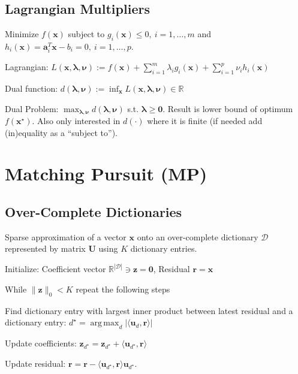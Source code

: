 \documentclass[a4paper, 11pt, landscape]{article}
\DeclareMathOperator*{\argmax}{arg\,max}
\begin{document}
\begin{multicols*}{3}
\subsection{Lagrangian Multipliers}
Minimize  $f(\mathbf{x})$ subject to $g_i(\mathbf{x}) \leq 0,\ i = 1, \ldots, m$ and $h_i(\mathbf{x}) = \mathbf{a}_i^T \mathbf{x} - b_i = 0,\ i = 1, \ldots, p$.
\begin{compactdesc}
	\item[Lagrangian:] $L(\mathbf{x}, \boldsymbol{\lambda}, \boldsymbol{\nu}) := f(\mathbf{x}) + \sum_{i=1}^m \lambda_i g_i(\mathbf{x}) + \sum_{i=1}^p \nu_i h_i(\mathbf{x})$
	\item[Dual function:] $d(\boldsymbol{\lambda}, \boldsymbol{\nu}) := \inf_{\mathbf{x}} L(\mathbf{x}, \boldsymbol{\lambda}, \boldsymbol{\nu}) \in \mathbb{R}$
	\item[Dual Problem:] $\max_{\boldsymbol{\lambda}, \boldsymbol{\nu}} d(\boldsymbol{\lambda}, \boldsymbol{\nu})$ s.t. $\boldsymbol{\lambda} \geq \mathbf{0}$. Result is lower bound of optimum $f(\mathbf{x}^\star)$. Also only interested in $d(\cdot)$ where it is finite (if needed add (in)equality as a ``subject to'').
\end{compactdesc}

\section{Matching Pursuit (MP)}
\subsection{Over-Complete Dictionaries}
Sparse approximation of a vector $\mathbf{x}$ onto an over-complete dictionary $\mathcal{D}$ represented by matrix $\mathbf{U}$ using $K$ dictionary entries.
\begin{compactenum}
	\item Initialize: Coefficient vector $\mathbb{R}^{|\mathcal{D}|} \ni \mathbf{z} = \mathbf{0}$, Residual $\mathbf{r} = \mathbf{x}$
	\item While $\|\mathbf{z}\|_0 < K$ repeat the following steps
	\item Find dictionary entry with largest inner product between latest residual and a dictionary entry: $d^\star = \argmax_d |\langle \mathbf{u}_d, \mathbf{r} \rangle|$
	\item Update coefficients: $\mathbf{z}_{d^\star} = \mathbf{z}_{d^\star} + \langle \mathbf{u}_{d^\star}, \mathbf{r} \rangle$
	\item Update residual: $\mathbf{r} = \mathbf{r} - \langle \mathbf{u}_{d^\star}, \mathbf{r} \rangle \mathbf{u}_{d^\star}$.
\end{compactenum}


\end{multicols*}
\end{document}
